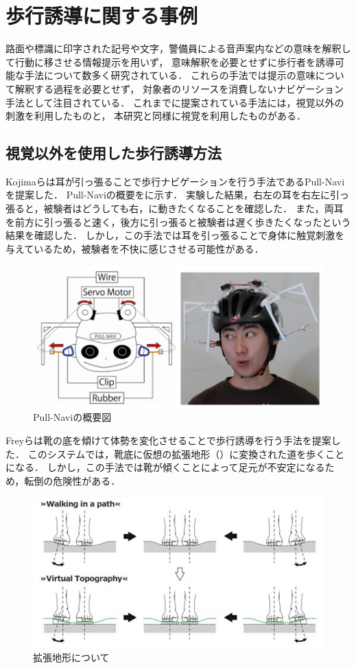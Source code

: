 \section{歩行誘導に関する事例}
路面や標識に印字された記号や文字，警備員による音声案内などの意味を解釈して行動に移させる情報提示を用いず，
意味解釈を必要とせずに歩行者を誘導可能な手法について数多く研究されている．
これらの手法では提示の意味について解釈する過程を必要とせず，
対象者のリソースを消費しないナビゲーション手法として注目されている．
これまでに提案されている手法には，視覚以外の刺激を利用したものと，
本研究と同様に視覚を利用したものがある．

\subsection{視覚以外を使用した歩行誘導方法}
Kojimaらは耳が引っ張ることで歩行ナビゲーションを行う手法であるPull-Naviを提案した\cite{kojima}．
Pull-Naviの概要をに示す．
実験した結果，右左の耳を右左に引っ張ると，被験者はどうしても右，に動きたくなることを確認した．
また，両耳を前方に引っ張ると速く，後方に引っ張ると被験者は遅く歩きたくなったという結果を確認した．
しかし，この手法では耳を引っ張ることで身体に触覚刺激を与えているため，被験者を不快に感じさせる可能性がある．
\begin{figure}[H]
    \centering
    \includegraphics[clip, width=0.8\linewidth]{fig/6.PNG}
    \caption{Pull-Naviの概要図}
    \label{fig:6}
\end{figure}



Freyらは靴の底を傾けて体勢を変化させることで歩行誘導を行う手法を提案した\cite{Frey}．
このシステムでは，靴底に仮想の拡張地形（）に変換された道を歩くことになる．
しかし，この手法では靴が傾くことによって足元が不安定になるため，転倒の危険性がある．
\begin{figure}[H]
    \centering
    \includegraphics[clip, width=0.8\linewidth]{fig/10.PNG}
    \caption{拡張地形について}
    \label{fig:10}
\end{figure}



